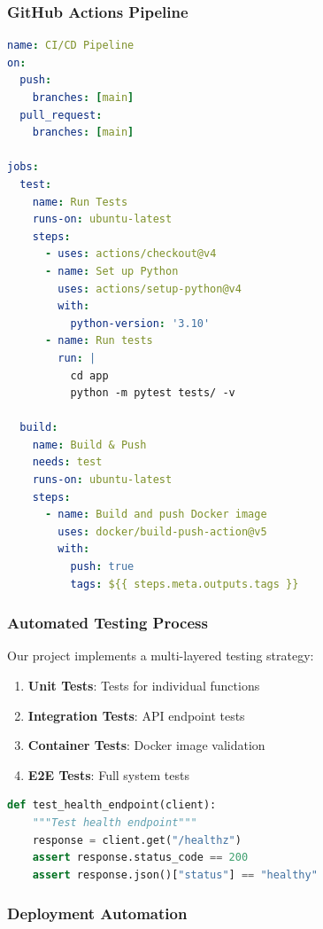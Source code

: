 \documentclass[12pt,a4paper]{article}
\begin{document}
\subsubsection{GitHub Actions Pipeline}

\begin{lstlisting}[language=yaml, caption=CI/CD Pipeline Structure]
name: CI/CD Pipeline
on:
  push:
    branches: [main]
  pull_request:
    branches: [main]

jobs:
  test:
    name: Run Tests
    runs-on: ubuntu-latest
    steps:
      - uses: actions/checkout@v4
      - name: Set up Python
        uses: actions/setup-python@v4
        with:
          python-version: '3.10'
      - name: Run tests
        run: |
          cd app
          python -m pytest tests/ -v

  build:
    name: Build & Push
    needs: test
    runs-on: ubuntu-latest
    steps:
      - name: Build and push Docker image
        uses: docker/build-push-action@v5
        with:
          push: true
          tags: ${{ steps.meta.outputs.tags }}
\end{lstlisting}

\subsubsection{Automated Testing Process}

Our project implements a multi-layered testing strategy:

\begin{enumerate}
    \item \textbf{Unit Tests}: Tests for individual functions
    \item \textbf{Integration Tests}: API endpoint tests
    \item \textbf{Container Tests}: Docker image validation
    \item \textbf{E2E Tests}: Full system tests
\end{enumerate}

\begin{lstlisting}[language=python, caption=Test Example]
def test_health_endpoint(client):
    """Test health endpoint"""
    response = client.get("/healthz")
    assert response.status_code == 200
    assert response.json()["status"] == "healthy"
\end{lstlisting}

\subsubsection{Deployment Automation}
\end{document}
